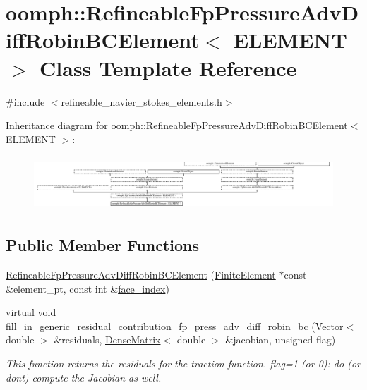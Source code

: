 \hypertarget{classoomph_1_1RefineableFpPressureAdvDiffRobinBCElement}{}\section{oomph\+:\+:Refineable\+Fp\+Pressure\+Adv\+Diff\+Robin\+B\+C\+Element$<$ E\+L\+E\+M\+E\+NT $>$ Class Template Reference}
\label{classoomph_1_1RefineableFpPressureAdvDiffRobinBCElement}


{\ttfamily \#include $<$refineable\+\_\+navier\+\_\+stokes\+\_\+elements.\+h$>$}

Inheritance diagram for oomph\+:\+:Refineable\+Fp\+Pressure\+Adv\+Diff\+Robin\+B\+C\+Element$<$ E\+L\+E\+M\+E\+NT $>$\+:\begin{figure}[H]
\begin{center}
\leavevmode
\includegraphics[height=2.063882cm]{classoomph_1_1RefineableFpPressureAdvDiffRobinBCElement}
\end{center}
\end{figure}
\subsection*{Public Member Functions}
\begin{DoxyCompactItemize}
\item 
\hyperlink{classoomph_1_1RefineableFpPressureAdvDiffRobinBCElement_a7e0807edbc6be7c59b82210c091c5daa}{Refineable\+Fp\+Pressure\+Adv\+Diff\+Robin\+B\+C\+Element} (\hyperlink{classoomph_1_1FiniteElement}{Finite\+Element} $\ast$const \&element\+\_\+pt, const int \&\hyperlink{classoomph_1_1FaceElement_a478d577ac6db67ecc80f1f02ae3ab170}{face\+\_\+index})
\item 
virtual void \hyperlink{classoomph_1_1RefineableFpPressureAdvDiffRobinBCElement_ae1c6ebf08fa0aa27847b963cb3bcd581}{fill\+\_\+in\+\_\+generic\+\_\+residual\+\_\+contribution\+\_\+fp\+\_\+press\+\_\+adv\+\_\+diff\+\_\+robin\+\_\+bc} (\hyperlink{classoomph_1_1Vector}{Vector}$<$ double $>$ \&residuals, \hyperlink{classoomph_1_1DenseMatrix}{Dense\+Matrix}$<$ double $>$ \&jacobian, unsigned flag)
\begin{DoxyCompactList}\small\item\em This function returns the residuals for the traction function. flag=1 (or 0)\+: do (or don\textquotesingle{}t) compute the Jacobian as well. \end{DoxyCompactList}\end{DoxyCompactItemize}
